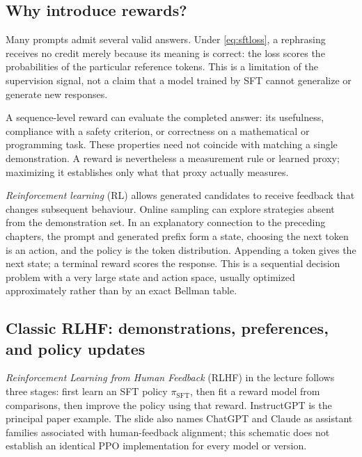 \documentclass[11pt,a4paper]{article}
\numberwithin{equation}{section}
\numberwithin{figure}{section}
\numberwithin{table}{section}
\begin{document}
\subsection{Why introduce rewards?}\label{sec:rlmotivation}
Many prompts admit several valid answers. Under \cref{eq:sftloss}, a rephrasing receives no credit merely because its meaning is correct: the loss scores the probabilities of the particular reference tokens. This is a limitation of the supervision signal, not a claim that a model trained by SFT cannot generalize or generate new responses.

A sequence-level reward can evaluate the completed answer: its usefulness, compliance with a safety criterion, or correctness on a mathematical or programming task. These properties need not coincide with matching a single demonstration. A reward is nevertheless a measurement rule or learned proxy; maximizing it establishes only what that proxy actually measures.

\emph{Reinforcement learning} (RL) allows generated candidates to receive feedback that changes subsequent behaviour. Online sampling can explore strategies absent from the demonstration set. In an explanatory connection to the preceding chapters, the prompt and generated prefix form a state, choosing the next token is an action, and the policy is the token distribution. Appending a token gives the next state; a terminal reward scores the response. This is a sequential decision problem with a very large state and action space, usually optimized approximately rather than by an exact Bellman table.

\subsection{Classic RLHF: demonstrations, preferences, and policy updates}\label{sec:rlhf}
\emph{Reinforcement Learning from Human Feedback} (RLHF) in the lecture follows three stages: first learn an SFT policy $\pi_{\mathrm{SFT}}$, then fit a reward model from comparisons, then improve the policy using that reward. InstructGPT is the principal paper example. The slide also names ChatGPT and Claude as assistant families associated with human-feedback alignment; this schematic does not establish an identical PPO implementation for every model or version.
\end{document}

